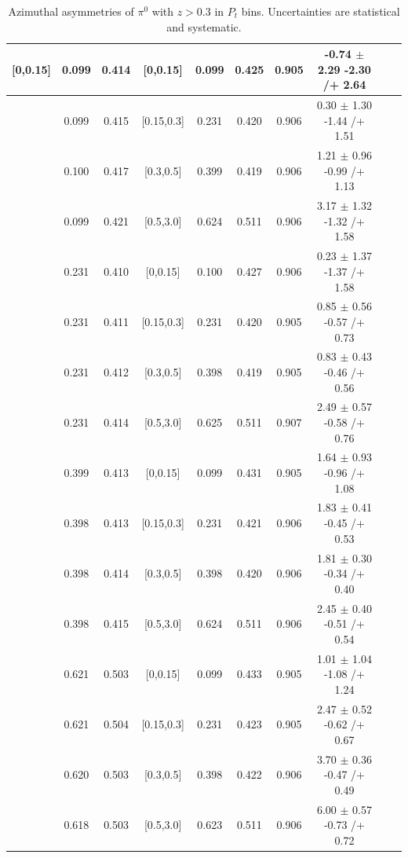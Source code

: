 \begin{table}[H]
\begin{tabular}{|c| c| c| c| c| c| c| c| c| c|}
[0,0.15]	&	0.099	&	0.414	&	[0,0.15]	&	0.099	&	0.425	&	0.905	&	-0.74	$\pm$ 	2.29	-2.30	/+	2.64	\\ \hline
[0,0.15]	&	0.099	&	0.415	&	[0.15,0.3]	&	0.231	&	0.420	&	0.906	&	0.30	$\pm$ 	1.30	-1.44	/+	1.51	\\ \hline
[0,0.15]	&	0.100	&	0.417	&	[0.3,0.5]	&	0.399	&	0.419	&	0.906	&	1.21	$\pm$ 	0.96	-0.99	/+	1.13	\\ \hline
[0,0.15]	&	0.099	&	0.421	&	[0.5,3.0]	&	0.624	&	0.511	&	0.906	&	3.17	$\pm$ 	1.32	-1.32	/+	1.58	\\ \hline
[0.15,0.3]	&	0.231	&	0.410	&	[0,0.15]	&	0.100	&	0.427	&	0.906	&	0.23	$\pm$ 	1.37	-1.37	/+	1.58	\\ \hline
[0.15,0.3]	&	0.231	&	0.411	&	[0.15,0.3]	&	0.231	&	0.420	&	0.905	&	0.85	$\pm$ 	0.56	-0.57	/+	0.73	\\ \hline
[0.15,0.3]	&	0.231	&	0.412	&	[0.3,0.5]	&	0.398	&	0.419	&	0.905	&	0.83	$\pm$ 	0.43	-0.46	/+	0.56	\\ \hline
[0.15,0.3]	&	0.231	&	0.414	&	[0.5,3.0]	&	0.625	&	0.511	&	0.907	&	2.49	$\pm$ 	0.57	-0.58	/+	0.76	\\ \hline
[0.3,0.5]	&	0.399	&	0.413	&	[0,0.15]	&	0.099	&	0.431	&	0.905	&	1.64	$\pm$ 	0.93	-0.96	/+	1.08	\\ \hline
[0.3,0.5]	&	0.398	&	0.413	&	[0.15,0.3]	&	0.231	&	0.421	&	0.906	&	1.83	$\pm$ 	0.41	-0.45	/+	0.53	\\ \hline
[0.3,0.5]	&	0.398	&	0.414	&	[0.3,0.5]	&	0.398	&	0.420	&	0.906	&	1.81	$\pm$ 	0.30	-0.34	/+	0.40	\\ \hline
[0.3,0.5]	&	0.398	&	0.415	&	[0.5,3.0]	&	0.624	&	0.511	&	0.906	&	2.45	$\pm$ 	0.40	-0.51	/+	0.54	\\ \hline
[0.5,3.0]	&	0.621	&	0.503	&	[0,0.15]	&	0.099	&	0.433	&	0.905	&	1.01	$\pm$ 	1.04	-1.08	/+	1.24	\\ \hline
[0.5,3.0]	&	0.621	&	0.504	&	[0.15,0.3]	&	0.231	&	0.423	&	0.905	&	2.47	$\pm$ 	0.52	-0.62	/+	0.67	\\ \hline
[0.5,3.0]	&	0.620	&	0.503	&	[0.3,0.5]	&	0.398	&	0.422	&	0.906	&	3.70	$\pm$ 	0.36	-0.47	/+	0.49	\\ \hline
[0.5,3.0]	&	0.618	&	0.503	&	[0.5,3.0]	&	0.623	&	0.511	&	0.906	&	6.00	$\pm$ 	0.57	-0.73	/+	0.72	\\ \hline\end{tabular}
\caption{Azimuthal asymmetries of $\pi^0$ with $z>0.3$ in $P_t$ bins. Uncertainties are statistical and systematic.}
\label{tab:finaletaptbin2}
\end{table}

